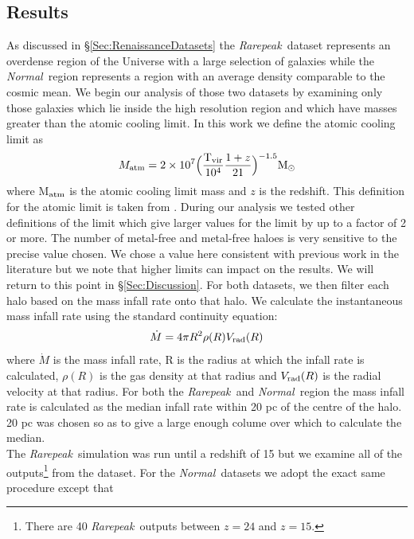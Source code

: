 \documentclass[graphics, twocolumn, usenatbib]{mn2e}
\newcommand{\rarepeak} {\textit{Rarepeak~}}
\newcommand{\normal} {\textit{Normal~}}
\begin{document}
\subsection{Results} \label{Sec:Results}

As discussed in \S \ref{Sec:RenaissanceDatasets} the \rarepeak dataset represents an overdense
region of the Universe with a large selection of galaxies while the \normal region represents a
region with an average density comparable to the cosmic mean. We begin our analysis of those two
datasets by examining only those galaxies which lie inside the high resolution region and which
have masses greater than the atomic cooling limit. In this work we define the atomic cooling
limit as
\begin{equation}
  M_{\rm atm} = 2 \times 10^{7} \Big ( \frac{\rm{T_{vir}}}{10^4}  \frac{1 + z}{21} \Big )^{-1.5} \rm{M_{\odot}}
\end{equation}
where M$_{\rm atm}$ is the atomic cooling limit mass and $z$ is the redshift.
This definition for the atomic limit is taken from \cite{Fernandez_2014}. During our analysis
we tested other definitions of the limit \citep[e.g.][]{Bromm_2011} which give larger
values for the limit by up to a factor of 2 or more. The number of metal-free and metal-free haloes
is very sensitive to the precise value chosen. We chose a value here consistent with previous
work in the literature but we note that higher limits can impact on the results. We will return to
this point in \S \ref{Sec:Discussion}.
For both datasets, we then filter each halo based on the mass infall rate onto that halo.
We calculate the instantaneous mass infall rate using the standard continuity equation:
\begin{equation}  
  \dot{M} = 4 \pi R^2 \rho(R) V_{\rm rad}(R)
\end{equation}
where  $\dot{M}$ is the mass infall rate, R is the radius at which the infall rate is calculated,
$\rho(R)$ is the gas density at that radius and $V_{\rm rad}(R)$ is the radial velocity at that radius.
For both the \rarepeak and \normal region the mass infall rate is calculated as the median
infall rate within 20 pc of the centre of the halo. 20 pc was chosen so as to give a large enough
colume over which to calculate the median. \\
\indent The \rarepeak simulation was run until a redshift of 15 but we
examine all of the outputs\footnote{There are 40 \rarepeak outputs between $z = 24$ and $z = 15$.}
from the dataset. For the \normal datasets we adopt the exact same procedure except that
\end{document}
